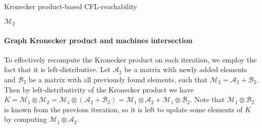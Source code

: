 \begin{algorithm}[h]
\begin{algorithmic}[1]
\footnotesize
\caption{Kronecker product-based CFL-reachability}
\label{tensor:cflr}
        


            \EndIf
       \EndFor
    \EndWhile
\State \Return $\mathcal{M}_2$
\EndFunction
\end{algorithmic}
\end{algorithm}


\paragraph*{Graph Kronecker product and machines intersection}

To effectively recompute the Kronecker product on each iteration, we employ the fact that it is left-distributive.
Let $\mathcal{A}_2$ be a matrix with newly added elements and $\mathcal{B}_2$ be a matrix with all previously found elements, such that $\mathcal{M}_2 = \mathcal{A}_2 + \mathcal{B}_2$.
Then by left-distributivity of the Kronecker product we have $K = \mathcal{M}_1 \otimes \mathcal{M}_2 = \mathcal{M}_1 \otimes (\mathcal{A}_2 + \mathcal{B}_2) = \mathcal{M}_1\otimes \mathcal{A}_2 + \mathcal{M}_1 \otimes \mathcal{B}_2$.
Note that $\mathcal{M}_1 \otimes \mathcal{B}_2$ is known from the previous iteration, so it is left to update some elements of $K$ by computing $\mathcal{M}_1\otimes \mathcal{A}_2$.

